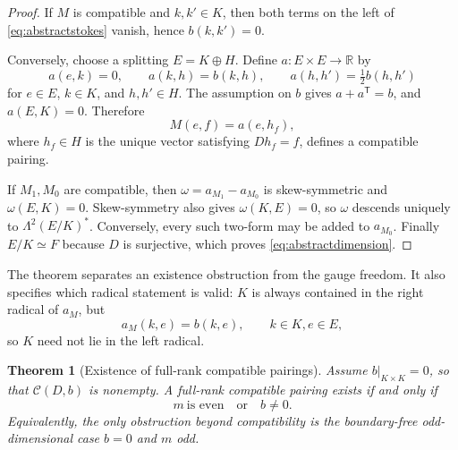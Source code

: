 \documentclass[11pt,a4paper]{article}
\newtheorem{theorem}{Theorem}[section]
\theoremstyle{definition}
\theoremstyle{remark}
\newcommand{\R}{\mathbb{R}}
\newcommand{\cC}{\mathcal{C}}
\begin{document}
\begin{proof}
If $M$ is compatible and $k,k'\in K$, then both terms on the left of
\eqref{eq:abstractstokes} vanish, hence $b(k,k')=0$.

Conversely, choose a splitting $E=K\oplus H$.  Define $a:E\times E\to\R$ by
\[
 a(e,k)=0,\qquad a(k,h)=b(k,h),\qquad
 a(h,h')=\tfrac12b(h,h')
\]
for $e\in E$, $k\in K$, and $h,h'\in H$.  The assumption on $b$ gives
$a+a^{\mathsf T}=b$, and $a(E,K)=0$.  Therefore
\[
 M(e,f)=a(e,h_f),
\]
where $h_f\in H$ is the unique vector satisfying $Dh_f=f$, defines a compatible pairing.

If $M_1,M_0$ are compatible, then
$\omega=a_{M_1}-a_{M_0}$ is skew-symmetric and $\omega(E,K)=0$.  Skew-symmetry also gives
$\omega(K,E)=0$, so $\omega$ descends uniquely to $\Lambda^2(E/K)^*$.  Conversely, every
such two-form may be added to $a_{M_0}$.  Finally $E/K\simeq F$ because $D$ is surjective,
which proves \eqref{eq:abstractdimension}.
\end{proof}

The theorem separates an existence obstruction from the gauge freedom.  It also specifies
which radical statement is valid: $K$ is always contained in the right radical of $a_M$, but
\begin{equation}\label{eq:leftradicalK}
 a_M(k,e)=b(k,e),\qquad k\in K, e\in E,
\end{equation}
so $K$ need not lie in the left radical.

\begin{theorem}[Existence of full-rank compatible pairings]
\label{thm:abstractfullrank}
Assume $b|_{K\times K}=0$, so that $\cC(D,b)$ is nonempty.  A full-rank compatible pairing
exists if and only if
\begin{equation}\label{eq:abstractfullrankcriterion}
 \boxed{\ m\ \text{is even}\quad\text{or}\quad b\neq0.\ }
\end{equation}
Equivalently, the only obstruction beyond compatibility is the boundary-free odd-dimensional
case $b=0$ and $m$ odd.
\end{theorem}
\end{document}
